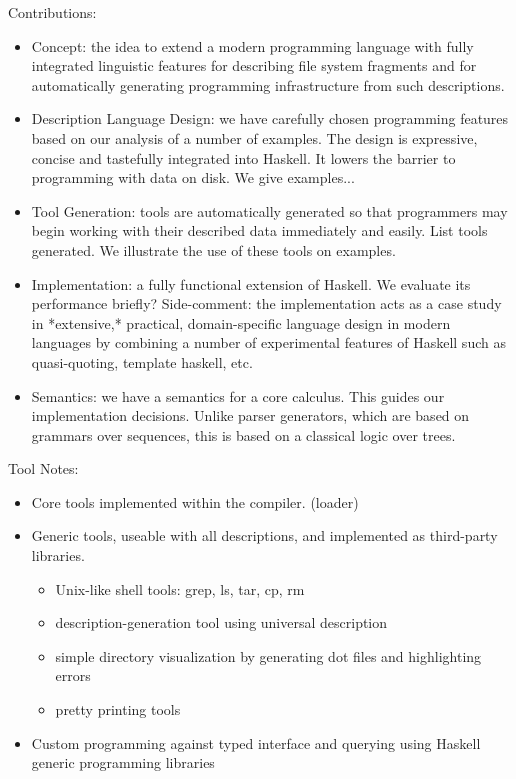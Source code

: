 \documentclass[nocopyrightspace,natbib]{sigplanconf}
\begin{document}
Contributions:

\begin{itemize}
\item Concept:  the idea to extend a modern programming language with
fully integrated linguistic features for describing file system fragments
and for automatically generating programming infrastructure from such 
descriptions.

\item Description Language Design: we have carefully chosen \forest{}
  programming features based on our analysis of a number of examples.
  The design is expressive, concise and tastefully integrated into
  Haskell.  It lowers the barrier to programming with data on disk.
  We give examples...

\item Tool Generation: tools are automatically generated so that
  programmers may begin working with their described data immediately
  and easily.  List tools generated.  We illustrate the use of these
  tools on examples.

\item Implementation: a fully functional extension of Haskell.  We
  evaluate its performance briefly?  Side-comment: the implementation
  acts as a case study in *extensive,* practical, domain-specific
  language design in modern languages by combining a number of
  experimental features of Haskell such as quasi-quoting, template
  haskell, etc.

\item Semantics: we have a semantics for a core calculus.  This guides
  our implementation decisions.  Unlike parser generators, which are
  based on grammars over sequences, this is based on a classical logic
  over trees.
\end{itemize}

Tool Notes:

\begin{itemize}
\item Core tools implemented within the compiler. (loader)
\item Generic tools, useable with all descriptions, and implemented as
  third-party libraries.
\begin{itemize}
\item Unix-like shell tools: grep, ls, tar, cp, rm
\item description-generation tool using universal description
\item simple directory visualization by generating dot files and highlighting errors
\item pretty printing tools
\end{itemize}
\item Custom programming against typed interface and querying using Haskell generic programming libraries
\end{itemize}
\end{document}
